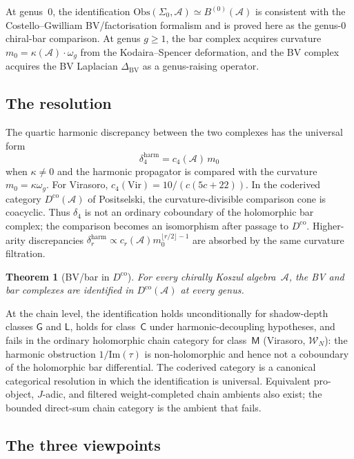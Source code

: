 \documentclass[11pt]{amsart}
\newcommand{\cA}{\mathcal{A}}
\newcommand{\cW}{\mathcal{W}}
\theoremstyle{plain}
\newtheorem{theorem}{Theorem}[section]
\theoremstyle{definition}
\theoremstyle{remark}
\begin{document}
At genus~$0$, the identification $\mathrm{Obs}(\Sigma_0, \cA)
\simeq B^{(0)}(\cA)$ is consistent with the Costello--Gwilliam
BV/factorisation formalism and is proved here as the genus-$0$
chiral-bar comparison. At
genus $g \geq 1$, the bar complex acquires curvature
$m_0 = \kappa(\cA) \cdot \omega_g$ from the Kodaira--Spencer
deformation, and the BV complex acquires the BV Laplacian
$\Delta_{\mathrm{BV}}$ as a genus-raising operator.

\subsection{The resolution}

The quartic harmonic discrepancy between the two complexes has
the universal form
\[
\delta_4^{\mathrm{harm}}
= c_4(\cA)\,m_0
\]
when $\kappa\neq0$ and the harmonic propagator is compared with
the curvature $m_0=\kappa\omega_g$.  For Virasoro,
$c_4(\mathrm{Vir})=10/(c(5c+22))$.  In the coderived category
$D^{\mathrm{co}}(\cA)$ of Positselski, the curvature-divisible
comparison cone is coacyclic.  Thus $\delta_4$ is not an ordinary
coboundary of the holomorphic bar complex; the comparison becomes
an isomorphism after passage to $D^{\mathrm{co}}$. Higher-arity discrepancies
$\delta_r^{\mathrm{harm}} \propto c_r(\cA)m_0^{\lfloor r/2\rfloor-1}$
are absorbed by the same curvature filtration.

\begin{theorem}[BV/bar in $D^{\mathrm{co}}$]
For every chirally Koszul algebra~$\cA$, the BV and bar
complexes are identified in $D^{\mathrm{co}}(\cA)$ at every
genus.
\end{theorem}

At the chain level, the identification holds unconditionally for
shadow-depth classes $\mathsf{G}$ and $\mathsf{L}$, holds for
class~$\mathsf{C}$ under harmonic-decoupling hypotheses, and
fails in the ordinary holomorphic chain category for
class~$\mathsf{M}$ (Virasoro, $\cW_N$): the
harmonic obstruction $1/\mathrm{Im}(\tau)$ is non-holomorphic
and hence not a coboundary of the holomorphic bar differential.
The coderived category is a canonical categorical resolution in
which the identification is universal.  Equivalent pro-object,
$J$-adic, and filtered weight-completed chain ambients also exist;
the bounded direct-sum chain category is the ambient that fails.

\subsection{The three viewpoints}
\end{document}
